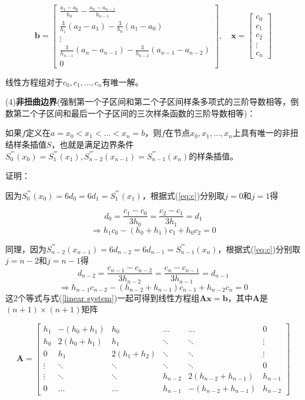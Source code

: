 \documentclass[12pt]{ctexart}
\begin{document}
	\[
	\mathbf{b}=\begin{bmatrix}
	\frac{a_1-a_0}{h_0}-\frac{a_n-a_{n-1}}{h_{n-1}} \\
	\frac{3}{h_1}(a_2-a_1)-\frac{3}{h_0}(a_1-a_0) \\
	\vdots \\
	\frac{3}{h_{n-1}}(a_n-a_{n-1})-\frac{3}{h_{n-2}}(a_{n-1}-a_{n-2}) \\
	0
	\end{bmatrix},\quad
	\mathbf{x}=\begin{bmatrix}
	c_0 \\
	c_1 \\
	c_2 \\
	\vdots \\
	c_n
	\end{bmatrix}
	\]
	
	线性方程组对于$c_0,c_1,\dots,c_n$有唯一解。
	
	(4)\textbf{非扭曲边界}(强制第一个子区间和第二个子区间样条多项式的三阶导数相等，倒数第二个子区间和最后一个子区间的三次样条函数的三阶导数相等)：
	
	如果$f$定义在$a=x_0<x_1<\dots<x_n=b$，则$f$在节点$x_0,x_1,\dots,x_n$上具有唯一的非扭结样条插值$S$，也就是满足边界条件$S_0^{'''}(x_0)=S_1^{'''}(x_1),S_{n-2}^{'''}(x_{n-1})=S_{n-1}^{'''}(x_{n})$的样条插值。
	
	证明：
	
	因为$S_0^{'''}(x_0)=6d_0=6d_1=S_1^{'''}(x_1)$，根据式(\ref{eq:c})分别取$j=0$和$j=1$得
	
	\begin{equation*}
	d_0=\frac{c_1-c_0}{3h_0}=\frac{c_2-c_1}{3h_1}=d_1
	\end{equation*}
	\begin{equation*}
	\Rightarrow
	h_1c_0-(h_0+h_1)c_1+h_0c_2=0
	\end{equation*}
	
	同理，因为$S_{n-2}^{'''}(x_{n-1})=6d_{n-2}=6d_{n-1}=S_{n-1}^{'''}(x_n)$，根据式(\ref{eq:c})分别取$j=n-2$和$j=n-1$得
	\begin{equation*}
	d_{n-2}=\frac{c_{n-1}-c_{n-2}}{3h_{n-2}}=\frac{c_n-c_{n-1}}{3h_{n-1}}=d_{n-1}
	\end{equation*}
	\begin{equation*}
	\Rightarrow
	h_{n-1}c_{n-2}-(h_{n-2}+h_{n-1})c_{n-1}+h_{n-2}c_n=0
	\end{equation*}
	这2个等式与式(\ref{linear system})一起可得到线性方程组$\mathbf{Ax}=\mathbf{b}$，其中$\mathbf{A}$是$(n+1)\times(n+1)$矩阵
	
	\[
	\mathbf{A}=\begin{bmatrix}
	h_1&-(h_0+h_1)&h_0&\dots&\dots&0 \\
	h_0&2(h_0+h_1)&h_1&\ddots&\ddots&\vdots \\
	0&h_1&2(h_1+h_2)&\ddots&\ddots&\vdots \\
	\vdots&\ddots&\ddots&\ddots&\ddots&0 \\
	\vdots&\ddots&\ddots&h_{n-2}&2(h_{n-2}+h_{n-1})&h_{n-1} \\
	0&\dots&\dots&h_{n-1}&-(h_{n-2}+h_{n-1})&h_{n-2}
	\end{bmatrix}
	\]
	
\end{document}
